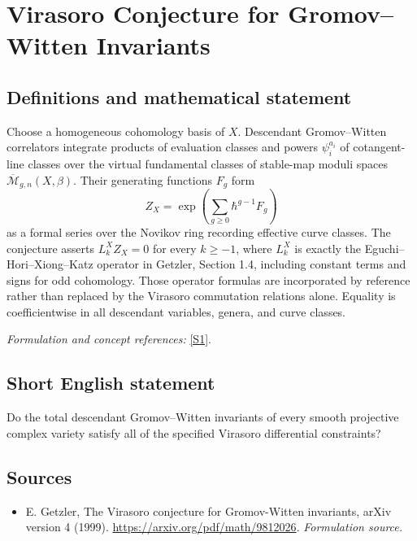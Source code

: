 \documentclass[11pt]{article}
\begin{document}
\section*{\texorpdfstring{Virasoro Conjecture for Gromov–Witten Invariants}{Virasoro Conjecture for Gromov–Witten Invariants}}\label{237}
\subsection{Definitions and mathematical statement}
Choose a homogeneous cohomology basis of $X$. Descendant Gromov--Witten correlators integrate products of evaluation classes and powers $\psi_i^{a_i}$ of cotangent-line classes over the virtual fundamental classes of stable-map moduli spaces $\overline{\mathcal M}_{g,n}(X,\beta)$. Their generating functions $F_g$ form
\[
 Z_X=\exp\left(\sum_{g\ge0}\hbar^{g-1}F_g\right)
\]
as a formal series over the Novikov ring recording effective curve classes. The conjecture asserts $L_k^XZ_X=0$ for every $k\ge-1$, where $L_k^X$ is exactly the Eguchi--Hori--Xiong--Katz operator in Getzler, Section 1.4, including constant terms and signs for odd cohomology. Those operator formulas are incorporated by reference rather than replaced by the Virasoro commutation relations alone. Equality is coefficientwise in all descendant variables, genera, and curve classes.
\par\smallskip\textit{Formulation and concept references:} \href{https://arxiv.org/pdf/math/9812026}{[S1]}.

\subsection{Short English statement}
Do the total descendant Gromov–Witten invariants of every smooth projective complex variety satisfy all of the specified Virasoro differential constraints?
\subsection{Sources}
\begin{itemize}
\item[S1]E. Getzler, The Virasoro conjecture for Gromov-Witten invariants, arXiv version 4 (1999).
\url{https://arxiv.org/pdf/math/9812026}.
\textit{Formulation source.}
\end{itemize}
\end{document}
